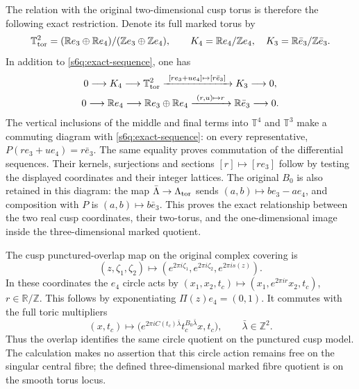 The relation with the original two-dimensional cusp torus is therefore
the following exact restriction. Denote its full marked torus by
\[
 \mathbb T^2_{\rm tor}=
 (\mathbb Re_3\oplus\mathbb Re_4)/(\mathbb Ze_3\oplus\mathbb Ze_4),
 \qquad K_4=\mathbb Re_4/\mathbb Ze_4,\quad
 K_3=\mathbb R\bar e_3/\mathbb Z\bar e_3.
\]
In addition to \eqref{s6q:exact-sequence}, one has
\begin{equation}
 \begin{gathered}
 0\longrightarrow K_4\longrightarrow\mathbb T^2_{\rm tor}
 \xrightarrow{\ [re_3+ue_4]\mapsto[r\bar e_3]\ }
 K_3\longrightarrow0,\\
 0\longrightarrow\mathbb Re_4\longrightarrow
 \mathbb Re_3\oplus\mathbb Re_4
 \xrightarrow{\ (r,u)\mapsto r\ }
 \mathbb R\bar e_3\longrightarrow0.
 \end{gathered}
 \label{s6q:cusp-torus-restriction}
\end{equation}
The vertical inclusions of the middle and final terms into $\mathbb T^4$
and $\mathbb T^3$ make a commuting diagram with
\eqref{s6q:exact-sequence}: on every representative,
$P(re_3+ue_4)=r\bar e_3$. The same equality proves commutation of the
differential sequences. Their kernels, surjections and sections
$[r]\mapsto[re_3]$ follow by testing the displayed coordinates and their
integer lattices. The original $B_0$ is also retained in this diagram:
the map $\bar\Lambda\to\Lambda_{\rm tor}$ sends
$(a,b)\mapsto be_3-ae_4$, and composition with $P$ is
$(a,b)\mapsto b\bar e_3$. This proves the exact relationship between
the two real cusp coordinates, their two-torus, and the one-dimensional
image inside the three-dimensional marked quotient.

The cusp punctured-overlap map on the original complex covering is
\[
 (z,\zeta_1,\zeta_2)\longmapsto
 (e^{2\pi i\zeta_1},e^{2\pi i\zeta_2},e^{2\pi is(z)}).
\]
In these coordinates the $e_4$ circle acts by
$(x_1,x_2,t_c)\mapsto(x_1,e^{2\pi i r}x_2,t_c)$,
$r\in\mathbb R/\mathbb Z$. This follows by exponentiating
$\Pi(z)e_4=(0,1)$. It commutes with the full toric multipliers
\[
 (x,t_c)\longmapsto
 \bigl(e^{2\pi iC(t_c)\bar\lambda}
                t_c^{B_0\bar\lambda}x,t_c\bigr),
 \qquad\bar\lambda\in\mathbb Z^2.
\]
Thus the overlap identifies the same circle quotient on the punctured
cusp model. The calculation makes no assertion that this circle action
remains free on the singular central fibre; the defined three-dimensional
marked fibre quotient is on the smooth torus locus.

